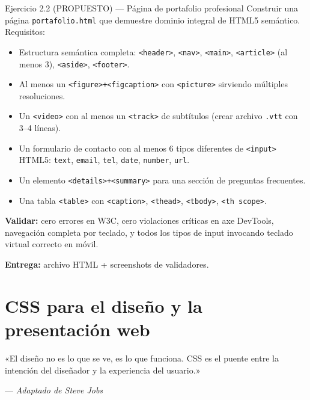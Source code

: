 \documentclass[11pt,a4paper,openany]{book}
\begin{document}
\begin{cajaejercicio}{Ejercicio 2.2 (PROPUESTO) --- Página de portafolio profesional}
Construir una página \texttt{portafolio.html} que demuestre dominio
integral de HTML5 semántico. Requisitos:

\begin{itemize}
\item Estructura semántica completa: \texttt{<header>}, \texttt{<nav>},
\texttt{<main>}, \texttt{<article>} (al menos 3), \texttt{<aside>},
\texttt{<footer>}.
\item Al menos un \texttt{<figure>+<figcaption>} con
\texttt{<picture>} sirviendo múltiples resoluciones.
\item Un \texttt{<video>} con al menos un \texttt{<track>} de
subtítulos (crear archivo \texttt{.vtt} con 3--4 líneas).
\item Un formulario de contacto con al menos 6 tipos diferentes de
\texttt{<input>} HTML5: \texttt{text}, \texttt{email}, \texttt{tel},
\texttt{date}, \texttt{number}, \texttt{url}.
\item Un elemento \texttt{<details>+<summary>} para una sección de
preguntas frecuentes.
\item Una tabla \texttt{<table>} con \texttt{<caption>},
\texttt{<thead>}, \texttt{<tbody>}, \texttt{<th scope>}.
\end{itemize}

\textbf{Validar:} cero errores en W3C, cero violaciones críticas en
axe DevTools, navegación completa por teclado, y todos los tipos de
input invocando teclado virtual correcto en móvil.

\textbf{Entrega:} archivo HTML + screenshots de validadores.
\end{cajaejercicio}


\chapter{CSS para el diseño y la presentación web}
\label{cap:semana3}

\epigraph{«El diseño no es lo que se ve, es lo que funciona. CSS es
el puente entre la intención del diseñador y la experiencia del
usuario.»}{--- \textit{Adaptado de Steve Jobs}}
\end{document}
